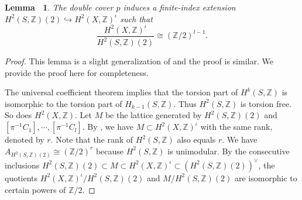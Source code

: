 \documentclass[12pt,reqno,a4paper]{amsart}
\newtheorem{lem}[thm]{Lemma~}
\theoremstyle{remark}
\theoremstyle{definition}
\begin{document}
\begin{lem}
\label{lemma: double cover manifold}
    The double cover $p$ induces a finite-index extension $H^2(S,\mathbb{Z})(2)\hookrightarrow H^2(X,\mathbb{Z})^\iota$ such that
    \begin{equation*}
        \frac{H^2(X,\mathbb{Z})^\iota}{H^2(S,\mathbb{Z})(2)}\cong (\mathbb{Z}/2)^{l-1}.
    \end{equation*}
\end{lem}
\begin{proof}
This lemma is a slight generalization of \cite[Prop $3.4$]{yu2023moduli} and the proof is similar. We provide the proof here for completeness.

The universal coefficient theorem implies that the torsion part of $H^k(S,\mathbb{Z})$ is isomorphic to the torsion part of $H_{k-1}(S,\mathbb{Z})$. Thus $H^2(S,\mathbb{Z})$ is torsion free. So does $H^2(X,\mathbb{Z})$.
Let $M$ be the lattice generated by $H^2(S,\mathbb{Z})(2)$ and $[\pi^{-1}C_1],\cdots,[\pi^{-1}C_l]$.
    By \cite[Lemma $3.3$]{yu2023moduli}, we have $M\subset H^2(X,\mathbb{Z})^\iota$ with the same rank, denoted by $r$.
    Note that the rank of $H^2(S,\mathbb{Z})$ also equals $r$.
    We have $A_{H^2(S,\mathbb{Z})(2)}\cong (\mathbb{Z}/2)^{r}$ because $H^2(S,\mathbb{Z})$ is unimodular.
    By the consecutive inclusions $H^2(S,\mathbb{Z})(2)\subset M\subset H^2(X,\mathbb{Z})^\iota\subset (H^2(S,\mathbb{Z})(2))^{\vee}$, the quotients $H^2(X,\mathbb{Z})^\iota/H^2(S,\mathbb{Z})(2)$ and $M/H^2(S,\mathbb{Z})(2)$ are isomorphic to certain powers of $\mathbb{Z}/2$.


\end{proof}
\end{document}
